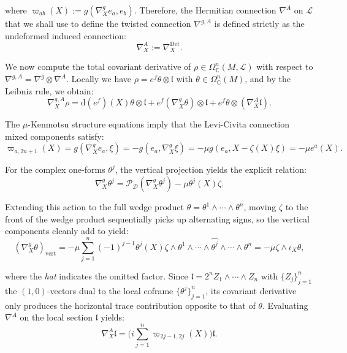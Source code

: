 \documentclass[10pt,a4paper,twoside,reqno]{amsart}
\theoremstyle{plain}
\theoremstyle{definition}
\theoremstyle{remark}
\def\C{\mathbb{C}}
\def\dd{\mathrm{d}}
\def\dd{\mathrm{d}}
\begin{document}
\noindent
where $\varpi_{ab}(X):=g(\nabla^g_Xe_a,e_b)$. Therefore, the Hermitian connection $\nabla^A$ on $\mathcal{L}$ that we shall use to define the twisted connection $\nabla^{g,A}$ is defined strictly as the undeformed induced connection:
\begin{equation*}
\nabla^A_X := \nabla^{\mathrm{Det}}_X.
\end{equation*}

\noindent
We now compute the total covariant derivative of $\rho \in\Omega^n_\C(M,\mathcal{L})$ with respect to $\nabla^{g,A} = \nabla^g \otimes \nabla^A$. Locally we have $\rho = e^f \theta\otimes\mathfrak{l}$ with $\theta\in \Omega^n_{\C}(M)$, and by the Leibniz rule, we obtain:
\begin{equation*}
\nabla^{g,A}_X \rho = \dd(e^f)(X) \theta \otimes \mathfrak{l} + e^f (\nabla^g_X \theta) \otimes \mathfrak{l} + e^f \theta \otimes (\nabla^A_X \mathfrak{l}).
\end{equation*}

The $\mu$-Kenmotsu structure equations imply that the Levi-Civita connection mixed components satisfy:
\begin{equation*}
\varpi_{a, 2n+1}(X) = g(\nabla^g_X e_a, \xi) = -g(e_a, \nabla_X^g \xi) = -\mu g(e_a, X - \zeta(X)\xi) = -\mu e^a(X).
\end{equation*}

\noindent
For the complex one-forms $\theta^j$, the vertical projection yields the explicit relation:
\begin{equation*}
\nabla^g_X \theta^j = \mathcal{P}_{\mathcal{D}}(\nabla^g_X \theta^j)  - \mu \theta^j(X) \zeta.
\end{equation*}

\noindent
Extending this action to the full wedge product $\theta = \theta^1 \wedge \cdots \wedge \theta^n$, moving $\zeta$ to the front of the wedge product sequentially picks up alternating signs, so the vertical components cleanly add to yield:
\begin{equation*}
(\nabla^g_X \theta)_{\text{vert}} = -\mu \sum_{j=1}^n (-1)^{j-1} \theta^j(X)\zeta \wedge \theta^1 \wedge \cdots \wedge \widehat{\theta^j} \wedge \cdots \wedge \theta^n = -\mu \zeta \wedge \iota_X \theta,
\end{equation*}

\noindent
where the \emph{hat} indicates the omitted factor. Since $\mathfrak{l}=2^n Z_1 \wedge \cdots \wedge Z_n$ with $\{Z_j\}_{j=1}^n$ the $(1,0)$-vectors dual to the local coframe $\{\theta^j\}_{j=1}^n$, its covariant derivative only produces the horizontal trace contribution opposite to that of $\theta$. Evaluating $\nabla^A$ on the local section $\mathfrak{l}$ yields:
\begin{equation*}
\nabla^A_X \mathfrak{l} = \Big(i\sum_{j=1}^n \varpi_{2j-1, 2j}(X)\Big)\mathfrak{l}.
\end{equation*}
\end{document}
